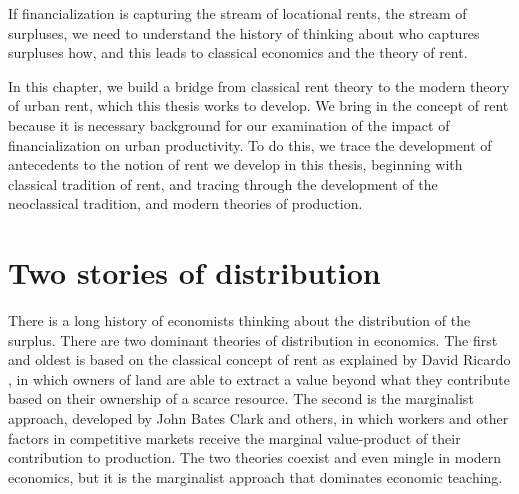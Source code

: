 If financialization is capturing the stream of locational rents, the stream of surpluses, we need to understand the history of thinking about who captures surpluses how, and this leads to classical economics and the theory of rent.

In this chapter, we build a bridge from \gls{classical rent theory} to the modern theory of urban rent, which this thesis works to develop. 
We bring in the concept of rent because it is necessary background for our examination of the impact of \gls{financialization} on urban productivity. To do this, we trace the development of antecedents to the notion of rent we develop in this thesis, beginning with classical tradition of rent, and tracing through the development of the neoclassical tradition, and modern theories of production. 





\section{Two stories of distribution}
There is a long history of economists thinking about the distribution of the surplus. %
There are two dominant theories of \gls{distribution} in economics. The first and oldest is based on the classical concept of rent as explained  by David Ricardo \cite{ricardoEssayInfluenceLow1815}, in which owners of land are able to extract a value beyond what they contribute based on their ownership of a scarce resource. The second is the marginalist approach, developed by John Bates Clark and others, in which workers and other factors  in competitive markets receive the \gls{marginal value-product} of their contribution to production. The two theories coexist and even mingle in modern economics, but it is the marginalist approach that dominates economic teaching. 

